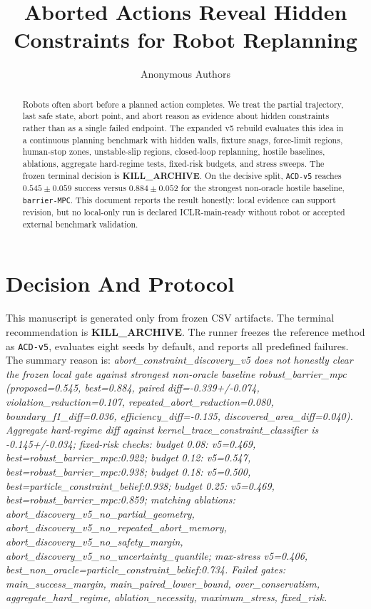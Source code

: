 \documentclass{article}
\title{Aborted Actions Reveal Hidden Constraints for Robot Replanning}
\author{Anonymous Authors}
\begin{document}
\maketitle

\begin{abstract}
Robots often abort before a planned action completes.  We treat the partial trajectory, last safe state, abort point, and abort reason as evidence about hidden constraints rather than as a single failed endpoint.  The expanded v5 rebuild evaluates this idea in a continuous planning benchmark with hidden walls, fixture snags, force-limit regions, human-stop zones, unstable-slip regions, closed-loop replanning, hostile baselines, ablations, aggregate hard-regime tests, fixed-risk budgets, and stress sweeps.  The frozen terminal decision is \textbf{KILL\_ARCHIVE}.  On the decisive split, \texttt{ACD-v5} reaches $0.545 \pm 0.059$ success versus $0.884 \pm 0.052$ for the strongest non-oracle hostile baseline, \texttt{barrier-MPC}.  This document reports the result honestly: local evidence can support revision, but no local-only run is declared ICLR-main-ready without robot or accepted external benchmark validation.
\end{abstract}

\section{Decision And Protocol}
This manuscript is generated only from frozen CSV artifacts.  The terminal recommendation is \textbf{KILL\_ARCHIVE}.  The runner freezes the reference method as \texttt{ACD-v5}, evaluates eight seeds by default, and reports all predefined failures.  The summary reason is: \emph{abort\_constraint\_discovery\_v5 does not honestly clear the frozen local gate against strongest non-oracle baseline robust\_barrier\_mpc (proposed=0.545, best=0.884, paired diff=-0.339+/-0.074, violation\_reduction=0.107, repeated\_abort\_reduction=0.080, boundary\_f1\_diff=0.036, efficiency\_diff=-0.135, discovered\_area\_diff=0.040). Aggregate hard-regime diff against kernel\_trace\_constraint\_classifier is -0.145+/-0.034; fixed-risk checks: budget 0.08: v5=0.469, best=robust\_barrier\_mpc:0.922; budget 0.12: v5=0.547, best=robust\_barrier\_mpc:0.938; budget 0.18: v5=0.500, best=particle\_constraint\_belief:0.938; budget 0.25: v5=0.469, best=robust\_barrier\_mpc:0.859; matching ablations: abort\_discovery\_v5\_no\_partial\_geometry, abort\_discovery\_v5\_no\_repeated\_abort\_memory, abort\_discovery\_v5\_no\_safety\_margin, abort\_discovery\_v5\_no\_uncertainty\_quantile; max-stress v5=0.406, best\_non\_oracle=particle\_constraint\_belief:0.734. Failed gates: main\_success\_margin, main\_paired\_lower\_bound, over\_conservatism, aggregate\_hard\_regime, ablation\_necessity, maximum\_stress, fixed\_risk.}
\end{document}
